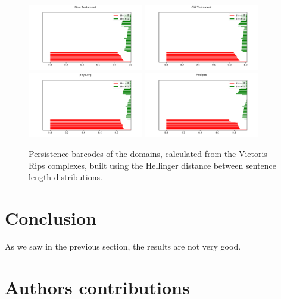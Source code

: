 \documentclass[12pt,a4paper]{amsart}
\begin{document}
\begin{figure}
  \centering
  \includegraphics[width=0.45\textwidth]{../plots/barcodes/bible-new-hell}
  \includegraphics[width=0.45\textwidth]{../plots/barcodes/bible-old-hell}
  \includegraphics[width=0.45\textwidth]{../plots/barcodes/phys-hell}
  \includegraphics[width=0.45\textwidth]{../plots/barcodes/recipes-hell}
  \caption{Persistence barcodes of the domains, calculated from the
    Vietoris-Rips complexes, built using the Hellinger distance between sentence
    length distributions.}
  \label{fig:barcode:hell}
\end{figure}

\section{Conclusion}

As we saw in the previous section, the results are not very good.



\section{Authors contributions}



\end{document}
